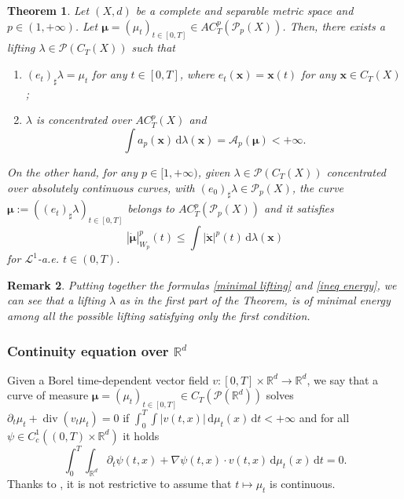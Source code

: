 \documentclass[10pt,leqno]{amsart}
\numberwithin{equation}{section}
\newtheorem{teorema}{Theorem}[section]
\newtheorem{oss}[teorema]{Remark}
\newcommand{\R}{\mathbb{R}}
\newcommand{\PP}{\mathcal{P}}
\renewcommand{\d}{\mathrm{d}}
\begin{document}
\begin{teorema}\label{lisini lifting}
    Let $(X,d)$ be a complete and separable metric space and $p\in (1,+\infty)$. Let $\boldsymbol{\mu}=(\mu_t)_{t\in [0,T]} \in AC^p_T(\PP_p(X))$. Then, there exists a lifting $\lambda\in \PP(C_T(X))$ such that 
    \begin{enumerate}
        \item $(e_t)_{\sharp}\lambda = \mu_t$ for any $t\in [0,T]$, where $e_t (\boldsymbol{x}) = \boldsymbol{x}(t)$ for any $\boldsymbol{x}\in C_T(X)$;
        \item $\lambda$ is concentrated over $AC_T^p(X)$ and
        \begin{equation}\label{minimal lifting}
            \int a_p(\boldsymbol{x}) \,\d\lambda (\boldsymbol{x}) = \mathcal{A}_p(\boldsymbol{\mu}) < +\infty.
        \end{equation}
    \end{enumerate}
    On the other hand, for any $p\in [1,+\infty)$, given $\lambda\in \PP(C_T(X))$ concentrated over absolutely continuous curves, with $(e_0)_\sharp\lambda\in \PP_p(X)$, the curve $\boldsymbol{\mu}:= ((e_t)_\sharp\lambda)_{t\in [0,T]}$ belongs to $AC^p_T(\PP_p(X))$ and it satisfies
    \begin{equation}\label{ineq energy}
        |\dot{\boldsymbol{\mu}}|_{W_p}^p (t) \leq \int |\dot{\boldsymbol{x}}|^p(t) \,\d\lambda(\boldsymbol{x})
    \end{equation}
    for $\mathcal{L}^1$-a.e. $t\in (0,T)$.
\end{teorema}


\begin{oss}\label{remark minimal}  
    Putting together the formulas \eqref{minimal lifting} and \eqref{ineq energy}, we can see that a lifting $\lambda$ as in the first part of the Theorem, is of minimal energy among all the possible lifting satisfying only the first condition. 
\end{oss}







\subsubsection{Continuity equation over \texorpdfstring{$\R^d$}{}}\label{subsub CE prob over R^d}

Given a Borel time-dependent vector field $v:[0,T]\times \R^d \to \R^d$, we say that a curve of measure $\boldsymbol{\mu}=(\mu_t)_{t\in [0,T]} \in C_T(\PP(\R^d))$ solves $\partial_t\mu_t +\operatorname{div}(v_t\mu_t)=0$ if $\int_0^T\int |v(t,x)|\,\d\mu_t(x) \,\d t <+\infty$ and for all $\psi\in C_c^{1}((0,T)\times \R^d)$ it holds
\begin{equation}\label{fin dim ce}
    \int_0^T \int_{\R^d} \partial_t\psi(t,x) + \nabla\psi(t,x)\cdot v(t,x) \,\d\mu_t(x) \,\d t = 0.
\end{equation}
Thanks to \cite[Lemma 8.1.2]{ambrosio2005gradient}, it is not restrictive to assume that $t\mapsto \mu_t$ is continuous.
\end{document}
